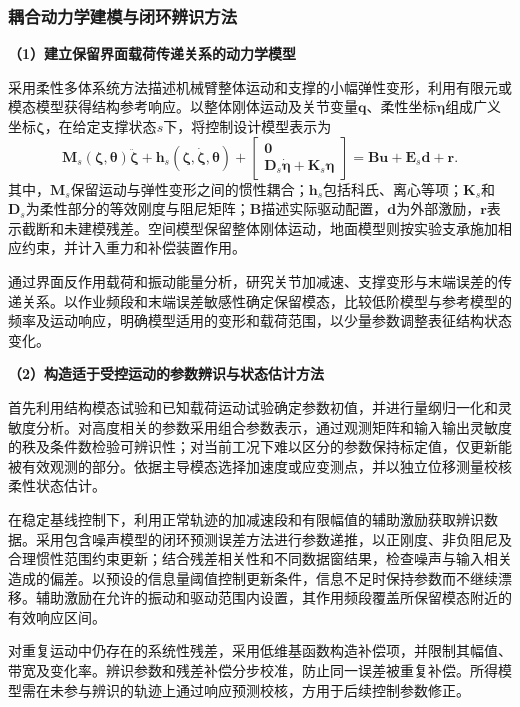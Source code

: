 \documentclass[UTF8,a4paper,zihao=-4,fontset=fandol]{ctexart}
\newcommand{\topic}[1]{\par\addvspace{0.5em}\noindent\textbf{#1}\par\nobreak}
\begin{document}
\subsubsection{耦合动力学建模与闭环辨识方法}

\topic{（1）建立保留界面载荷传递关系的动力学模型}

采用柔性多体系统方法描述机械臂整体运动和支撑的小幅弹性变形，利用有限元或模态模型获得结构参考响应。以整体刚体运动及关节变量$\bm q$、柔性坐标$\bm\eta$组成广义坐标$\bm\zeta$，在给定支撑状态$s$下，将控制设计模型表示为
\begin{equation}
 \bm M_s(\bm\zeta,\bm\theta)\ddot{\bm\zeta}
 +\bm h_s(\bm\zeta,\dot{\bm\zeta},\bm\theta)
 +\begin{bmatrix}\bm 0\\\bm D_s\dot{\bm\eta}+\bm K_s\bm\eta\end{bmatrix}
 =\bm B\bm u+\bm E_s\bm d+\bm r .
 \label{eq:model}
\end{equation}
其中，$\bm M_s$保留运动与弹性变形之间的惯性耦合；$\bm h_s$包括科氏、离心等项；$\bm K_s$和$\bm D_s$为柔性部分的等效刚度与阻尼矩阵；$\bm B$描述实际驱动配置，$\bm d$为外部激励，$\bm r$表示截断和未建模残差。空间模型保留整体刚体运动，地面模型则按实验支承施加相应约束，并计入重力和补偿装置作用。

通过界面反作用载荷和振动能量分析，研究关节加减速、支撑变形与末端误差的传递关系。以作业频段和末端误差敏感性确定保留模态，比较低阶模型与参考模型的频率及运动响应，明确模型适用的变形和载荷范围，以少量参数调整表征结构状态变化。

\topic{（2）构造适于受控运动的参数辨识与状态估计方法}

首先利用结构模态试验和已知载荷运动试验确定参数初值，并进行量纲归一化和灵敏度分析。对高度相关的参数采用组合参数表示，通过观测矩阵和输入输出灵敏度的秩及条件数检验可辨识性；对当前工况下难以区分的参数保持标定值，仅更新能被有效观测的部分。依据主导模态选择加速度或应变测点，并以独立位移测量校核柔性状态估计。

在稳定基线控制下，利用正常轨迹的加减速段和有限幅值的辅助激励获取辨识数据。采用包含噪声模型的闭环预测误差方法进行参数递推，以正刚度、非负阻尼及合理惯性范围约束更新；结合残差相关性和不同数据窗结果，检查噪声与输入相关造成的偏差。以预设的信息量阈值控制更新条件，信息不足时保持参数而不继续漂移。辅助激励在允许的振动和驱动范围内设置，其作用频段覆盖所保留模态附近的有效响应区间。

对重复运动中仍存在的系统性残差，采用低维基函数构造补偿项，并限制其幅值、带宽及变化率。辨识参数和残差补偿分步校准，防止同一误差被重复补偿。所得模型需在未参与辨识的轨迹上通过响应预测校核，方用于后续控制参数修正。
\end{document}
